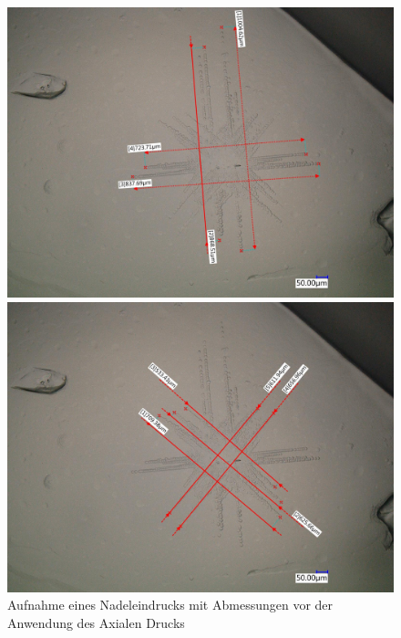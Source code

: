             \begin{figure}[H]
                \begin{minipage}[b]{.4\linewidth} %
                \includegraphics[width=\linewidth]{Images/eriks rosette 1 messung A.jpg}
                \end{minipage}
                \hspace{.1\linewidth}%
                \begin{minipage}[b]{.4\linewidth} %
                \includegraphics[width=\linewidth]{Images/eriks rosette 1 messung B.jpg}
                \end{minipage}
                \caption{Aufnahme eines Nadeleindrucks mit Abmessungen vor der Anwendung des Axialen Drucks}
            \end{figure}
